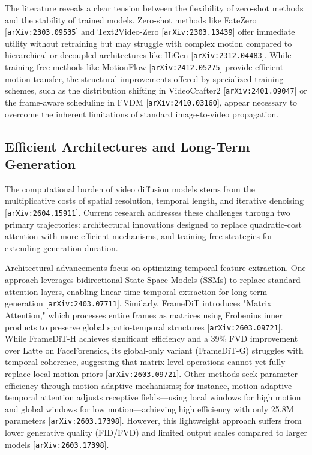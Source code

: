 \documentclass[11pt]{article}
\begin{document}
The literature reveals a clear tension between the flexibility of zero-shot methods and the stability of trained models. Zero-shot methods like FateZero [\texttt{arXiv:2303.09535}] and Text2Video-Zero [\texttt{arXiv:2303.13439}] offer immediate utility without retraining but may struggle with complex motion compared to hierarchical or decoupled architectures like HiGen [\texttt{arXiv:2312.04483}]. While training-free methods like MotionFlow [\texttt{arXiv:2412.05275}] provide efficient motion transfer, the structural improvements offered by specialized training schemes, such as the distribution shifting in VideoCrafter2 [\texttt{arXiv:2401.09047}] or the frame-aware scheduling in FVDM [\texttt{arXiv:2410.03160}], appear necessary to overcome the inherent limitations of standard image-to-video propagation.

\subsection{Efficient Architectures and Long-Term Generation}

The computational burden of video diffusion models stems from the multiplicative costs of spatial resolution, temporal length, and iterative denoising [\texttt{arXiv:2604.15911}]. Current research addresses these challenges through two primary trajectories: architectural innovations designed to replace quadratic-cost attention with more efficient mechanisms, and training-free strategies for extending generation duration.

Architectural advancements focus on optimizing temporal feature extraction. One approach leverages bidirectional State-Space Models (SSMs) to replace standard attention layers, enabling linear-time temporal extraction for long-term generation [\texttt{arXiv:2403.07711}]. Similarly, FrameDiT introduces "Matrix Attention," which processes entire frames as matrices using Frobenius inner products to preserve global spatio-temporal structures [\texttt{arXiv:2603.09721}]. While FrameDiT-H achieves significant efficiency and a 39\% FVD improvement over Latte on FaceForensics, its global-only variant (FrameDiT-G) struggles with temporal coherence, suggesting that matrix-level operations cannot yet fully replace local motion priors [\texttt{arXiv:2603.09721}]. Other methods seek parameter efficiency through motion-adaptive mechanisms; for instance, motion-adaptive temporal attention adjusts receptive fields—using local windows for high motion and global windows for low motion—achieving high efficiency with only 25.8M parameters [\texttt{arXiv:2603.17398}]. However, this lightweight approach suffers from lower generative quality (FID/FVD) and limited output scales compared to larger models [\texttt{arXiv:2603.17398}].
\end{document}
